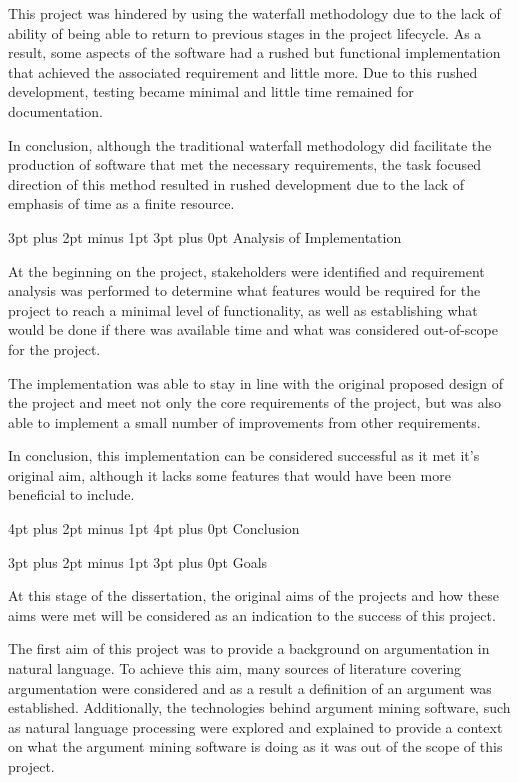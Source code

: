 \documentclass[12pt,a4paper]{article}
\makeatletter
\renewcommand\subsection{\@startsection {subsection}{1}{2mm} %
                               {3pt plus 2pt minus 1pt} %
                               {3pt plus 0pt} %
                               {\normalfont\bfseries}}
\renewcommand\section{\@startsection {section}{1}{0mm} %
                               {4pt plus 2pt minus 1pt} %
                               {4pt plus 0pt} %
                               {\bfseries}}
\makeatother
\begin{document}
This project was hindered by using the waterfall methodology due to the lack of ability of being able to return to previous stages in the project lifecycle. As a result, some aspects of the software had a rushed but functional implementation that achieved the associated requirement and little more. Due to this rushed development, testing became minimal and little time remained for documentation.

In conclusion, although the traditional waterfall methodology did facilitate the production of software that met the necessary requirements, the task focused direction of this method resulted in rushed development due to the lack of emphasis of time as a finite resource. 

\subsection{Analysis of Implementation}

At the beginning on the project, stakeholders were identified and requirement analysis was performed to determine what features would be required for the project to reach a minimal level of functionality, as well as establishing what would be done if there was available time and what was considered out-of-scope for the project.

The implementation was able to stay in line with the original proposed design of the project and meet not only the core requirements of the project, but was also able to implement a small number of improvements from other requirements.

In conclusion, this implementation can be considered successful as it met it's original aim, although it lacks some features that would have been more beneficial to include.

\newpage
\section{Conclusion}

\subsection{Goals}

At this stage of the dissertation, the original aims of the projects and how these aims were met will be considered as an indication to the success of this project.

The first aim of this project was to provide a background on argumentation in natural language. To achieve this aim, many sources of literature covering argumentation were considered and as a result a definition of an argument was established. Additionally, the technologies behind argument mining software, such as natural language processing were explored and explained to provide a context on what the argument mining software is doing as it was out of the scope of this project.
\end{document}
